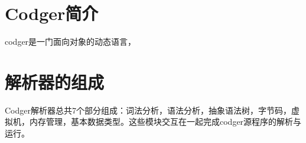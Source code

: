 \section{Codger简介}
codger是一门面向对象的动态语言，
\section{解析器的组成}
Codger解析器总共7个部分组成：词法分析，语法分析，抽象语法树，字节码，虚拟机，内存管理，基本数据类型。这些模块交互在一起完成codger源程序的解析与运行。